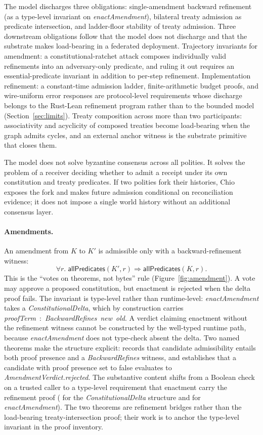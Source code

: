 The model discharges three obligations: single-amendment backward refinement (as a type-level invariant on \emph{enactAmendment}), bilateral treaty admission as predicate intersection, and ladder-floor stability of treaty admission. Three downstream obligations follow that the model does not discharge and that the substrate makes load-bearing in a federated deployment. Trajectory invariants for amendment: a constitutional-ratchet attack composes individually valid refinements into an adversary-only predicate, and ruling it out requires an essential-predicate invariant in addition to per-step refinement. Implementation refinement: a constant-time admission ladder, finite-arithmetic budget proofs, and wire-uniform error responses are protocol-level requirements whose discharge belongs to the Rust-Lean refinement program rather than to the bounded model (Section~\ref{sec:limits}). Treaty composition across more than two participants: associativity and acyclicity of composed treaties become load-bearing when the graph admits cycles, and an external anchor witness is the substrate primitive that closes them.

The model does not solve byzantine consensus across all polities. It solves the problem of a receiver deciding whether to admit a receipt under its own constitution and treaty predicates. If two polities fork their histories, Chio exposes the fork and makes future admission conditional on reconciliation evidence; it does not impose a single world history without an additional consensus layer.

\paragraph{Amendments.}
An amendment from $K$ to $K'$ is admissible only with a backward-refinement witness:
\[
\forall r.\;\mathsf{allPredicates}(K',r) \Rightarrow \mathsf{allPredicates}(K,r).
\]
This is the ``votes on theorems, not bytes'' rule (Figure~\ref{fig:amendment}). A vote may approve a proposed constitution, but enactment is rejected when the delta proof fails. The invariant is type-level rather than runtime-level: \emph{enactAmendment} takes a \emph{ConstitutionalDelta}, which by construction carries \emph{proofTerm}~:~\emph{BackwardRefines}~\emph{new}~\emph{old}. A verdict claiming enactment without the refinement witness cannot be constructed by the well-typed runtime path, because \emph{enactAmendment} does not type-check absent the delta. Two named theorems make the structure explicit:  records that candidate admissibility entails both proof presence and a \emph{BackwardRefines} witness, and  establishes that a candidate with proof presence set to false evaluates to \emph{AmendmentVerdict.rejected}. The substantive content shifts from a Boolean check on a trusted caller to a type-level requirement that enactment carry the refinement proof ( for the \emph{ConstitutionalDelta} structure and  for \emph{enactAmendment}). The two theorems are refinement bridges rather than the load-bearing treaty-intersection proof; their work is to anchor the type-level invariant in the proof inventory.

